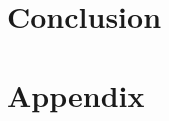 \documentclass{llncs}
\begin{document}
\section{Conclusion}









%
%





\appendix
\section{Appendix}
\label{app}

\end{document}
